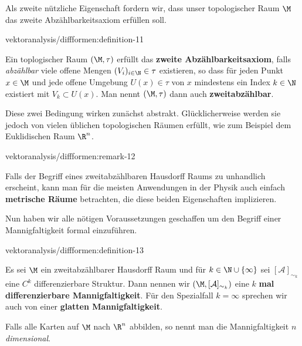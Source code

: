 \documentclass[letterpaper,10pt,english]{jupyterBook}
\begin{document}
\par
Als zweite nützliche Eigenschaft fordern wir, dass unser topologischer Raum \(\M\) das zweite Abzählbarkeitsaxiom erfüllen soll.
\begin{definition}{}{vektoranalysis/diffformen:definition-11}



\par
Ein toplogischer Raum \((\M, \tau)\) erfüllt das \textbf{zweite Abzählbarkeitsaxiom}, falls \emph{abzählbar} viele offene Mengen \((V_i)_{i\in\N} \in \tau\) existieren, so dass für jeden Punkt \(x\in \M\) und jede offene Umgebung \(U(x) \in \tau\) von \(x\) mindestens ein Index \(k\in\N\) existiert mit \(V_k \subset U(x)\).
Man nennt \((\M, \tau)\) dann auch \textbf{zweitabzählbar}.
\end{definition}

\par
Diese zwei Bedingung wirken zunächst abstrakt.
Glücklicherweise werden sie jedoch von vielen üblichen topologischen Räumen erfüllt, wie zum Beispiel dem Euklidischen Raum \(\R^n\).
\begin{remark}{}{vektoranalysis/diffformen:remark-12}



\par
Falls der Begriff eines zweitabzählbaren Hausdorff Raums zu unhandlich erscheint, kann man für die meisten Anwendungen in der Physik auch einfach \textbf{metrische Räume} betrachten, die diese beiden Eigenschaften implizieren.
\end{remark}

\par
Nun haben wir alle nötigen Voraussetzungen geschaffen um den Begriff einer Mannigfaltigkeit formal einzuführen.
\begin{definition}{}{vektoranalysis/diffformen:definition-13}



\par
Es sei \(\M\) ein zweitabzählbarer Hausdorff Raum und für \(k\in\N\cup \{\infty\}\) sei \([\mathcal{A}]_{\sim_k}\) eine \(C^k\) differenzierbare Struktur.
Dann nennen wir \((\M,[\mathcal{A}]_{\sim_k})\) eine \(k\) \textbf{mal differenzierbare Mannigfaltigkeit}.
Für den Spezialfall \(k=\infty\) sprechen wir auch von einer \textbf{glatten Mannigfaltigkeit}.

\par
Falls alle Karten auf \(\M\) nach \(\R^n\) abbilden, so nennt man die Mannigfaltigkeit \emph{\(n\) dimensional}.
\end{definition}
\end{document}
